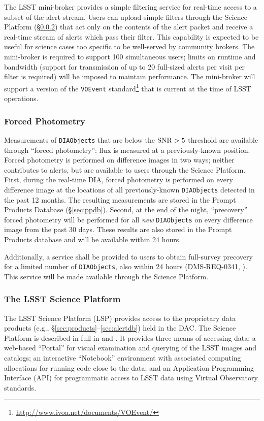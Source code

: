 The LSST mini-broker provides a simple filtering service for real-time access to a subset of the alert stream.
Users can upload simple filters through the Science Platform (\S \ref{sec:LSP}) that act only on the contents of the alert packet and receive a real-time stream of alerts which pass their filter.
This capability is expected to be useful for science cases too specific to be well-served by community brokers.
The mini-broker is required to support 100 simultaneous users; limits on runtime and bandwidth (support for transmission of up to 20 full-sized alerts per visit per filter is required) will be imposed to maintain performance.
The mini-broker will support a version of the \texttt{VOEvent} standard\footnote{\url{http://www.ivoa.net/documents/VOEvent/}} that is current at the time of LSST operations.

\subsubsection{Forced Photometry}\label{sec:AGP_force}

Measurements of \texttt{DIAObjects} that are below the ${\rm SNR} > 5$ threshold are available through ``forced photometry'': flux is measured at a previously-known position.
Forced photometry is performed on difference images in two ways; neither contributes to alerts, but are available to users through the Science Platform.
First, during the real-time DIA, forced photometry is performed on every difference image at the locations of all previously-known {\tt DIAObjects} detected in the past 12 months. 
The resulting measurements are stored in the Prompt Products Database (\S \ref{sec:ppdb}).
Second, at the end of the night, ``precovery'' forced photometry will be performed for all \textit{new} \texttt{DIAObjects} on every difference image from the past 30 days.
These results are also stored in the Prompt Products database and will be available within 24 hours.
 
Additionally, a service shall be provided to users to obtain full-survey precovery for a limited number of {\tt DIAObjects}, also within 24 hours (DMS-REQ-0341, ).
This service will be made available through the Science Platform.

\subsubsection{The LSST Science Platform} \label{sec:LSP}

The LSST Science Platform (LSP) provides access to the proprietary data products (e.g., \S \ref{sec:products}--\ref{sec:alertdb}) held in the DAC.
The Science Platform is described in full in  and .
It provides three means of accessing data: a web-based ``Portal'' for visual examination and querying of the LSST images and catalogs; 
an interactive ``Notebook'' environment with associated computing allocations for running code close to the data; 
and an Application Programming Interface (API) for programmatic access to LSST data using Virtual Observatory standards.


